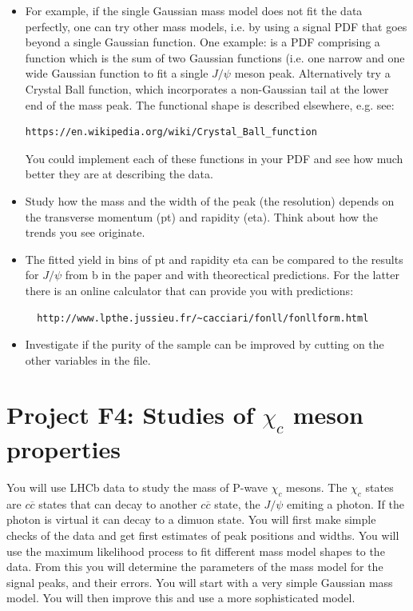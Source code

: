 \begin{enumerate}
\begin{itemize} 
\item For example, if the single
Gaussian mass model does not fit the data perfectly, one can try other mass models,
i.e. by using a signal PDF that goes beyond a single Gaussian
function. One example: is a PDF comprising a function which is the sum of two Gaussian functions (i.e. one
narrow and one wide Gaussian function to fit a single $J/\psi$ meson
peak. Alternatively try a Crystal Ball function, which incorporates a non-Gaussian tail at the lower end of
the mass peak. The functional shape is described elsewhere, e.g. see:
\begin{verbatim}
https://en.wikipedia.org/wiki/Crystal_Ball_function 
\end{verbatim} 
You could implement each of these functions in your PDF and see how much better
they are at describing the data.
\item Study how the mass and the width of the peak (the resolution)
  depends on the transverse momentum (pt) and rapidity (eta). Think about how the trends you see originate.
\item The fitted yield in bins of  pt and rapidity eta can be compared to the results for $J/\psi$ from b in the paper and with theorectical predictions. For the latter there is an online calculator that can provide you with predictions:
  \begin{verbatim}
  http://www.lpthe.jussieu.fr/~cacciari/fonll/fonllform.html
\end{verbatim} 
\item Investigate if the purity of the sample can be improved by cutting on the other variables in the file.
\end{itemize}

\end{enumerate}

 


\newpage
\section{Project F4: Studies of $\chi_c$ meson properties}
%
You will use LHCb data to study the mass of P-wave $\chi_c$ mesons. The $\chi_c$ states are $c\overline{c}$ states that can decay to another $c\overline{c}$ state, the  $J/\psi$ emiting a photon. If the photon is virtual it can decay to a dimuon state. You will first make simple checks of the data and get first estimates of peak positions and widths. You will use the maximum likelihood process to fit different mass model shapes to the data. From this you will determine the parameters of the mass model for the signal peaks, and their errors. You will start with a very simple Gaussian mass model. You will then improve this and use a more sophisticated model. 

